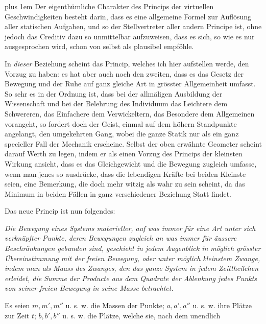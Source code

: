 \par{}
{\rightskip=0pt plus 1em Der eigenthümliche Charakter des Princips der virtuellen Geschwin\-digkeiten besteht darin, dass es eine allgemeine Formel zur Auflösung aller statischen Aufgaben, und so der Stellvertreter aller andern Principe ist, ohne jedoch das Creditiv dazu so unmittelbar aufzuweisen, dass es sich, so wie es nur ausgesprochen wird, schon von selbst als plausibel empföhle.\par}

In \textit{dieser} Beziehung scheint das Princip, welches ich hier aufstellen werde, den Vorzug zu haben: es hat aber auch noch den zweiten, dass es das Gesetz der Bewegung und der Ruhe auf ganz gleiche Art in grösster Allgemeinheit umfasst. So sehr es in der Ordnung ist, dass bei der allmäligen Ausbildung der Wissenschaft und bei der Belehrung des Individuum das Leichtere dem Schwereren, das Einfachere dem Verwickeltern, das Besondere dem Allgemeinen vorangeht, so fordert doch der Geist, einmal auf dem höhern Standpunkte angelangt, den umgekehrten Gang, wobei die ganze Statik nur als ein ganz specieller Fall der Mechanik erscheine. Selbst der oben erwähnte Geometer scheint darauf Werth zu legen, indem er als einen Vorzug des Princips der kleinsten Wirkung ansieht, dass es das Gleichgewicht und die Bewegung zugleich umfasse, wenn man jenes so ausdrücke, dass die lebendigen Kräfte bei beiden Kleinste seien, eine Bemerkung, die doch mehr witzig als wahr zu sein scheint, da das Minimum in beiden Fällen in ganz verschiedener Beziehung Statt findet.

Das neue Princip ist nun folgendes:

\textit{Die Bewegung eines Systems materieller, auf was immer für eine Art unter sich verknüpfter Punkte, deren Bewegungen zugleich an was immer für äussere Beschränkungen gebunden sind, geschieht in jedem Augenblick in möglich grösster Übereinstimmung mit der freien Bewegung, oder unter möglich kleinstem Zwange, indem man als Maass des Zwanges, den das ganze System in jedem Zeittheilchen erleidet, die Summe der Producte aus dem Quadrate der Ablenkung jedes Punkts von seiner freien Bewegung in seine Masse betrachtet.}

Es seien $m,m',m''$ u. s. w. die Massen der Punkte; $a,a',a''$ u. s. w. ihre Plätze zur Zeit $t$; $b,b',b''$ u. s. w. die Plätze, welche sie, nach dem unendlich
